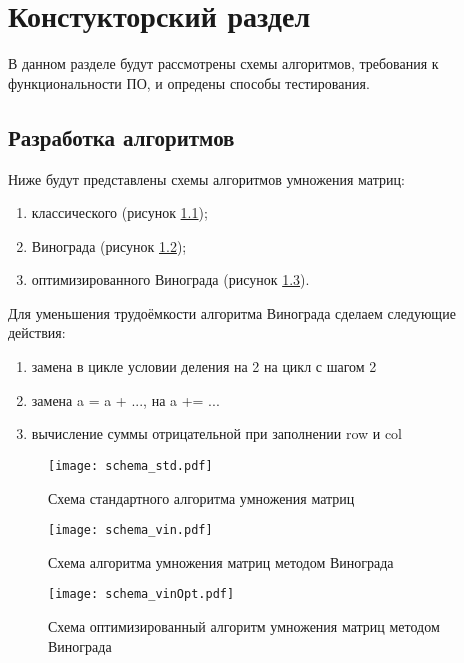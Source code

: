 \chapter{ Констукторский раздел}
\label{cha:design}
    В данном разделе будут рассмотрены схемы алгоритмов, требования к функциональности ПО,
    и опредены способы тестирования.
    
    \section{Разработка алгоритмов}
        Ниже будут представлены схемы алгоритмов умножения матриц: \begin{enumerate}
            \item классического (рисунок \ref{schema:standartDot});
            \item Винограда (рисунок \ref{schema:vinogradDot});
            \item оптимизированного Винограда (рисунок \ref{schema:vinogradDot:optimize}).
        \end{enumerate}

    Для уменьшения трудоёмкости алгоритма Винограда сделаем следующие действия:
    \begin{enumerate}
        \item замена в цикле условии деления на 2 на цикл с шагом 2
        \item замена a = a + ..., на a += ...
        \item вычисление суммы отрицательной при заполнении row и col 
    \end{enumerate}

    \begin{figure}[h!]
        \centering
            \texttt{[image: schema\_std.pdf]}
            \caption{Схема стандартного алгоритма умножения матриц}
            \label{schema:standartDot}
    \end{figure}

    \begin{figure}[h!]
        \centering
            \texttt{[image: schema\_vin.pdf]}
            \caption{Схема алгоритма умножения матриц методом Винограда}
            \label{schema:vinogradDot}
    \end{figure}

    \begin{figure}[h!]
        \centering
            \texttt{[image: schema\_vinOpt.pdf]}
            \caption{Схема оптимизированный алгоритм умножения матриц методом Винограда}
            \label{schema:vinogradDot:optimize}
    \end{figure}

